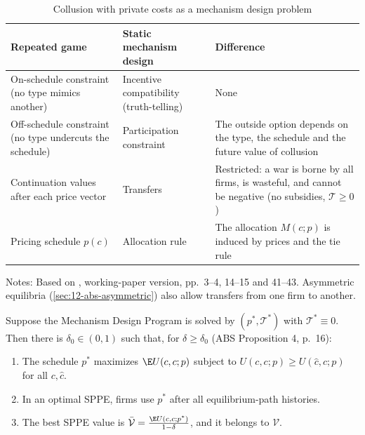 \begin{table}[htbp]
\centering
\caption{Collusion with private costs as a mechanism design problem}\label{tab:12-abs-analogy}
\begin{tabularx}{\textwidth}{@{}>{\raggedright\arraybackslash}X>{\raggedright\arraybackslash}X>{\raggedright\arraybackslash}X@{}}
\toprule
Repeated game & Static mechanism design & Difference \\
\midrule
On-schedule constraint (no type mimics another) & Incentive compatibility (truth-telling) & None \\
Off-schedule constraint (no type undercuts the schedule) & Participation constraint & The outside option depends on the type, the schedule and the future value of collusion \\
Continuation values after each price vector & Transfers & Restricted: a war is borne by all firms, is wasteful, and cannot be negative (no subsidies, $\mathcal T \ge 0$) \\
Pricing schedule $p(c)$ & Allocation rule & The allocation $M(c; p)$ is induced by prices and the tie rule \\
\bottomrule
\end{tabularx}

\smallskip
\begin{minipage}{0.95\textwidth}
\footnotesize Notes: Based on \citet{AtheyBagwellSanchirico2004}, working-paper version, pp.~3--4, 14--15 and 41--43.
Asymmetric equilibria (\cref{sec:12-abs-asymmetric}) also allow transfers from one firm to another.
\end{minipage}
\end{table}

\begin{proposition}[Staticizing]\label{prop:12-abs-staticizing}
Suppose the Mechanism Design Program is solved by $(p^*, \mathcal T^*)$ with $\mathcal T^* \equiv 0$. Then there is
$\delta_0 \in (0,1)$ such that, for $\delta \ge \delta_0$ (ABS Proposition 4, p.~16):
\begin{enumerate}[label=(\roman*)]
\item The schedule $p^*$ maximizes $\E U(c, c; p)$ subject to $U(c, c; p) \ge U(\hat c, c; p)$ for all $c, \hat c$.
\item In an optimal SPPE, firms use $p^*$ after all equilibrium-path histories.
\item The best SPPE value is $\bar{\mathcal V} = \frac{\E U(c, c; p^*)}{1 - \delta}$, and it belongs to $\mathcal V$.
\end{enumerate}
\end{proposition}

